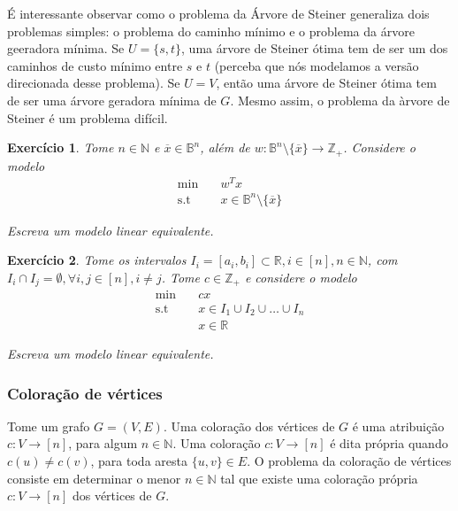 \documentclass[]{article}
\newtheorem{exercicio}{Exercício}
\numberwithin{equation}{section}
\begin{document}
É interessante observar como o problema da Árvore de Steiner generaliza dois problemas simples: o
problema do caminho mínimo e o problema da árvore geeradora mínima.
Se $U = \{s, t\}$, uma árvore de Steiner ótima tem de ser um dos caminhos de custo mínimo entre $s$ e
$t$ (perceba que nós modelamos a versão direcionada desse problema).
Se $U = V$, então uma árvore de Steiner ótima tem de ser uma árvore geradora mínima de $G$.
Mesmo assim, o problema da àrvore de Steiner é um  problema difícil.

\begin{exercicio}
  Tome $n \in \mathbb{N}$ e $\overline{x} \in \mathbb{B}^n$, além de
  $w : \mathbb{B}^n \setminus \{\overline{x}\} \to \mathbb{Z}_+$.
  Considere o modelo
  \begin{align}
  \min        &\quad  w^Tx \\
  \text{s.t}  &\quad  x \in \mathbb{B}^n \setminus \{\overline{x}\}
  \end{align}

  Escreva um modelo linear equivalente.
\end{exercicio}

\begin{exercicio}
  Tome os intervalos $I_i = [a_i, b_i] \subset \mathbb{R}, i \in [n], n \in \mathbb{N}$, com
  $I_i \cap I_j = \emptyset, \forall i, j \in [n], i \neq j$.
  Tome $c \in \mathbb{Z}_+$ e considere o modelo
  \begin{align}
  \min        &\quad  cx \\
  \text{s.t}  &\quad  x \in I_1 \cup I_2 \cup \dots \cup I_n \\
              &\quad  x \in \mathbb{R}
  \end{align}

  Escreva um modelo linear equivalente.
\end{exercicio}

\subsubsection{Coloração de vértices}

Tome um grafo $G = (V, E)$.
Uma coloração dos vértices de $G$ é uma atribuição $c : V \to [n]$, para algum $n \in \mathbb{N}$.
Uma coloração $c : V \to [n]$ é dita própria quando $c(u) \neq c(v)$, para toda aresta
$\{u, v\} \in E$.
O problema da coloração de vértices consiste em determinar o menor $n \in \mathbb{N}$ tal que existe
uma coloração própria $c : V \to [n]$ dos vértices de $G$.
\end{document}
